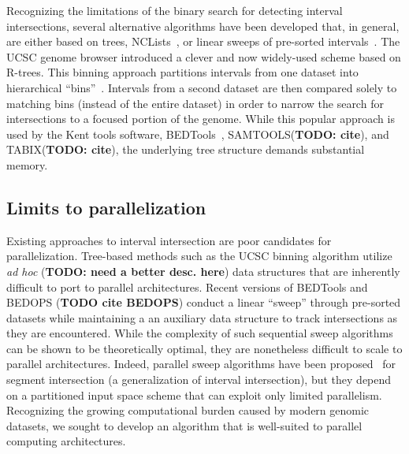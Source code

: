 \documentclass{bioinfo}
\begin{document}
	Recognizing the limitations of the binary search for detecting interval intersections, several alternative algorithms 
	have been developed that, in general, are either based on trees, NCLists~\citep{alekseyenko2007}, or linear sweeps of 
	pre-sorted intervals~\citep{richardson2006}. The UCSC genome browser introduced a clever and now widely-used 
	scheme based on R-trees. This binning approach partitions intervals from one dataset into hierarchical ``bins''~\citep{kent2002}.  
	Intervals from a second dataset are then compared solely to matching bins (instead of the 
	entire dataset) in order to narrow the search for intersections to a focused portion of the genome.  
	While this popular approach is used by the Kent tools software, BEDTools~\citep{quinlan2010}, 
	SAMTOOLS(\textbf{TODO: cite}), and TABIX(\textbf{TODO: cite}), the underlying tree structure 
	demands substantial memory. 


	\subsection{Limits to parallelization}

	Existing approaches to interval intersection are poor candidates for parallelization. 
	Tree-based methods such as the UCSC
	binning algorithm utilize \emph{ad hoc} (\textbf{TODO: need a better desc. here}) data structures
	that are inherently difficult to port to parallel architectures. Recent versions of BEDTools and 
	BEDOPS (\textbf{TODO cite BEDOPS}) conduct a linear ``sweep'' through pre-sorted datasets while maintaining a
	an auxiliary data structure to track intersections as they are encountered. While the
	complexity of such sequential sweep algorithms can be shown to be theoretically
	optimal, they are nonetheless difficult to scale to parallel architectures. Indeed, parallel sweep 
	algorithms have been proposed~\citep{goodrich1993, kriegel1991, mckenney2009} for segment
	intersection (a generalization of interval intersection), but they depend on a
	partitioned input space scheme that can exploit only limited parallelism.  Recognizing the growing 
	computational burden caused by modern genomic datasets, we sought to develop an algorithm that 
	is well-suited to parallel computing architectures.


	
\end{document}
